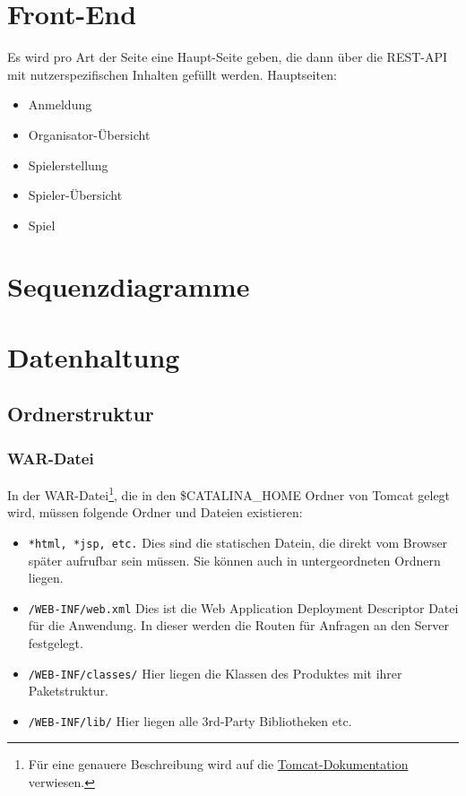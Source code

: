 \documentclass[a4paper]{scrreprt}
\begin{document}
	
	\chapter{Front-End}
	Es wird pro Art der Seite eine Haupt-Seite geben, die dann über die REST-API mit nutzerspezifischen Inhalten gefüllt werden.
	Hauptseiten:
	\begin{itemize}
		\item   Anmeldung
		\item   Organisator-Übersicht
		\item   Spielerstellung
		\item   Spieler-Übersicht
		\item   Spiel
	\end{itemize}
	\chapter{Sequenzdiagramme}
	
	\chapter{Datenhaltung}
	
	\section{Ordnerstruktur}
    \subsection{WAR-Datei}
        In der WAR-Datei\footnote{Für eine genauere Beschreibung wird auf die \href{https://tomcat.apache.org/tomcat-7.0-doc/appdev/deployment.html\#Standard\_Directory\_Layout}{Tomcat-Dokumentation} verwiesen.}, die in den \$CATALINA\_HOME Ordner von Tomcat gelegt wird, müssen folgende Ordner und Dateien existieren: 
    \begin{itemize}
        \item \texttt{*html, *jsp, etc.} Dies sind die statischen Datein, die direkt vom Browser später aufrufbar sein müssen. Sie können auch in untergeordneten Ordnern liegen.
        \item \texttt{/WEB-INF/web.xml} Dies ist die Web Application Deployment Descriptor Datei für die Anwendung. In dieser werden die Routen für Anfragen an den Server festgelegt.
        \item \texttt{/WEB-INF/classes/} Hier liegen die Klassen des Produktes mit ihrer Paketstruktur.
        \item \texttt{/WEB-INF/lib/} Hier liegen alle 3rd-Party Bibliotheken etc. 
    \end{itemize}
	
\end{document}

